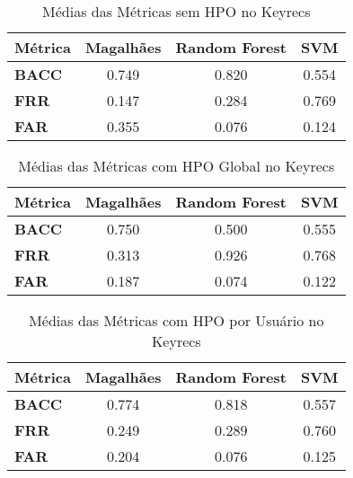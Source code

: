 \begin{table}[htbp]
\centering
\caption{Médias das Métricas sem HPO no Keyrecs}
\label{tab:keyrecs_sem_hpo}
\begin{tabular}{|l|c|c|c|}
\hline
\textbf{Métrica} & 
\textbf{Magalhães} & 
\textbf{Random Forest} & 
\textbf{SVM} \\
\hline
\textbf{BACC} & 
0.749 & 
0.820 & 
0.554 \\
\hline
\textbf{FRR} & 
0.147 & 
0.284 & 
0.769 \\
\hline
\textbf{FAR} & 
0.355 & 
0.076 & 
0.124 \\
\hline
\end{tabular}
\end{table}

\begin{table}[htbp]
\centering
\caption{Médias das Métricas com HPO Global no Keyrecs}
\label{tab:keyrecs_hpo_global}
\begin{tabular}{|l|c|c|c|}
\hline
\textbf{Métrica} & 
\textbf{Magalhães} & 
\textbf{Random Forest} & 
\textbf{SVM} \\
\hline
\textbf{BACC} & 
0.750 & 
0.500 & 
0.555 \\
\hline
\textbf{FRR} & 
0.313 & 
0.926 & 
0.768 \\
\hline
\textbf{FAR} & 
0.187 & 
0.074 & 
0.122 \\
\hline
\end{tabular}
\end{table}

\begin{table}[htbp]
\centering
\caption{Médias das Métricas com HPO por Usuário no Keyrecs}
\label{tab:keyrecs_hpo_usuario}
\begin{tabular}{|l|c|c|c|}
\hline
\textbf{Métrica} & 
\textbf{Magalhães} & 
\textbf{Random Forest} & 
\textbf{SVM} \\
\hline
\textbf{BACC} & 
0.774 & 
0.818 & 
0.557 \\
\hline
\textbf{FRR} & 
0.249 & 
0.289 & 
0.760 \\
\hline
\textbf{FAR} & 
0.204 & 
0.076 & 
0.125 \\
\hline
\end{tabular}
\end{table}